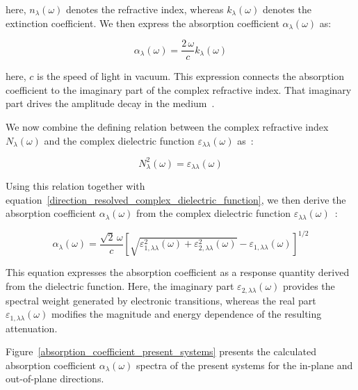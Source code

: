 here, $n_{\lambda}(\omega)$ denotes the refractive index,
whereas $k_{\lambda}(\omega)$ denotes the extinction coefficient.
We then express the absorption coefficient $\alpha_{\lambda}(\omega)$ as:

\begin{equation}
    \alpha_{\lambda}(\omega)
    = \frac{2\,\omega}{c}k_{\lambda}(\omega)
\label{absorption_coefficient_from_extinction_coefficient}
\end{equation}

here, $c$ is the speed of light in vacuum.
This expression connects the absorption coefficient to the imaginary part of the complex refractive index.
That imaginary part drives the amplitude decay in the medium~\cite{wooten2013optical, dressel2002electrodynamics,fox2010optical,gajdovs2006linear}.

We now combine the defining relation between the complex
refractive index $N_{\lambda}(\omega)$
and the complex dielectric function $\varepsilon_{\lambda\lambda}(\omega)$ as~\cite{born2013principles}:

\begin{equation}
    N_{\lambda}^{2}(\omega)= \varepsilon_{\lambda\lambda}(\omega)
\label{refractive_index_dielectric_relation}
\end{equation}

Using this relation together with equation~\eqref{direction_resolved_complex_dielectric_function},
we then derive the absorption coefficient $\alpha_{\lambda}(\omega)$ from the complex dielectric function $\varepsilon_{\lambda\lambda}(\omega)$~\cite{born2013principles}:

\begin{equation}
    \alpha_{\lambda}(\omega)
    = \frac{\sqrt{2}\,\omega}{c}
    \left[\sqrt{\varepsilon_{1,\lambda\lambda}^{2}(\omega)
        + \varepsilon_{2,\lambda\lambda}^{2}(\omega)}
        - \varepsilon_{1,\lambda\lambda}(\omega)\right]^{1/2}
\label{absorption_coefficient_from_dielectric_function}
\end{equation}

This equation expresses the absorption coefficient as a
response quantity derived from the dielectric function.
Here, the imaginary part $\varepsilon_{2,\lambda\lambda}(\omega)$ provides the spectral weight generated by electronic transitions,
whereas the real part $\varepsilon_{1,\lambda\lambda}(\omega)$ modifies the magnitude and energy dependence of the resulting attenuation.

Figure~\ref{absorption_coefficient_present_systems} presents the calculated absorption coefficient $\alpha_{\lambda}(\omega)$ spectra of the present systems for the in-plane and out-of-plane directions.


